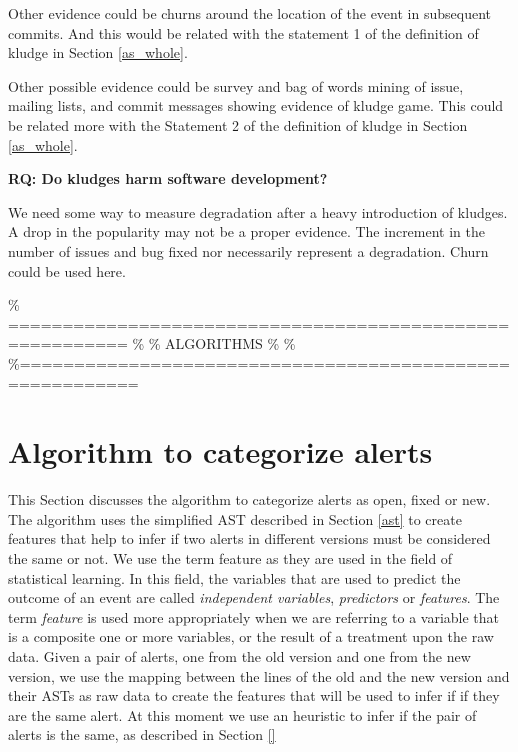 \documentclass[
]{article}
\begin{document}
Other evidence could be churns around the location of the event in
subsequent commits. And this would be related with the statement 1 of
the definition of kludge in Section \ref{as_whole}.

Other possible evidence could be survey and bag of words mining of
issue, mailing lists, and commit messages showing evidence of kludge
game. This could be related more with the Statement 2 of the definition
of kludge in Section \ref{as_whole}.

\vspace{16px}

\noindent \textbf{RQ: Do kludges harm software development?}
\label{kludge_harm}

We need some way to measure degradation after a heavy introduction of
kludges. A drop in the popularity may not be a proper evidence. The
increment in the number of issues and bug fixed nor necessarily
represent a degradation. Churn could be used here.

\% ========================================================= \% \%
ALGORITHMS \% \%
\%=========================================================

\section{Algorithm to categorize alerts}\label{alg}

This Section discusses the algorithm to categorize alerts as open, fixed
or new. The algorithm uses the simplified AST described in Section
\ref{ast} to create features that help to infer if two alerts in
different versions must be considered the same or not. We use the term
feature as they are used in the field of statistical learning. In this
field, the variables that are used to predict the outcome of an event
are called \emph{independent variables}, \emph{predictors} or
\emph{features}. The term \emph{feature} is used more appropriately when
we are referring to a variable that is a composite one or more
variables, or the result of a treatment upon the raw data. Given a pair
of alerts, one from the old version and one from the new version, we use
the mapping between the lines of the old and the new version and their
ASTs as raw data to create the features that will be used to infer if if
they are the same alert. At this moment we use an heuristic to infer if
the pair of alerts is the same, as described in Section \ref{}

\begin{center}
\end{center}
\end{document}
